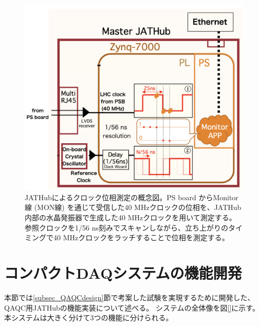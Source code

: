 \begin{figure} 
    \centering
    \includegraphics[width=14cm]{fig/QAQC/JATHubclockmasurement.png}
    \caption[JATHubによるクロック位相測定の概念図]{JATHubによるクロック位相測定の概念図\cite{mt_atanaka}。PS board からMonitor線 (MON線) を通じて受信した40 MHzクロックの位相を、JATHub内部の水晶発振器で生成した40 MHzクロックを用いて測定する。参照クロックを1/56 ns刻みでスキャンしながら、立ち上がりのタイミングで40 MHzクロックをラッチすることで位相を測定する。}
    \label{JATHubclockmeasure}
\end{figure}    

\clearpage
\section{コンパクトDAQシステムの機能開発}
\label{sec_QAQC_JATHub}
本節では\ref{subsec_QAQCdesign}節で考案した試験を実現するために開発した、QAQC用JATHubの機能実装について述べる。
システムの全体像を図\ref{}に示す。本システムは大きく分けて3つの機能に分けられる。

